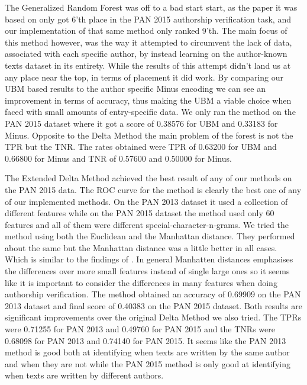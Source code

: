 The Generalized Random Forest was off to a bad start start, as the paper it
was based on \cite{pacheco2015} only got 6'th place in the PAN 2015 authorship
verification task, and our implementation of that same method only ranked 9'th.
The main focus of this method however, was the way it attempted to circumvent
the lack of data, associated with each specific author, by instead learning
on the author-known texts dataset in its entirety. While the results of this attempt
didn't land us at any place near the top, in terms of placement it did work. By
comparing our \gls{UBM} based results to the author specific Minus encoding we
can see an improvement in terms of accuracy, thus making the \gls{UBM} a viable
choice when faced with small amounts of entry-specific data. We only ran the
method on the PAN 2015 dataset where it got a score of 0.38576 for \gls{UBM} and
0.33183 for Minus. Opposite to the Delta Method the main problem of the forest
is not the \gls{TPR} but the \gls{TNR}. The rates obtained were \gls{TPR} of
0.63200 for \gls{UBM} and 0.66800 for Minus and \gls{TNR} of 0.57600 and 0.50000
for Minus. 

The Extended Delta Method achieved the best result of any of our methods on
the PAN 2015 data. The ROC curve for the method is clearly the best one of
any of our implemented methods. On the PAN 2013 dataset it used a collection
of different features while on the PAN 2015 dataset the method used only 60
features and all of them were different special-character-n-grams. We tried the
method using both the Euclidean and the Manhattan distance. They performed about
the same but the Manhattan distance was a little better in all cases. Which
is similar to the findings of \cite{evert2015towards}. In general Manhatten
distances emphasises the differences over more small features instead of single
large ones so it seems like it is important to consider the differences in many
features when doing authorship verification. The method obtained an accuracy
of 0.69909 on the PAN 2013 dataset and final score of 0.40383 on the PAN 2015
dataset. Both results are significant improvements over the original Delta
Method we also tried. The \gls{TPR}s were 0.71255 for PAN 2013 and 0.49760 for
PAN 2015 and the \gls{TNR}s were 0.68098 for PAN 2013 and 0.74140 for PAN 2015.
It seems like the PAN 2013 method is good both at identifying when texts are
written by the same author and when they are not while the PAN 2015 method is
only good at identifying when texts are written by different authors.

